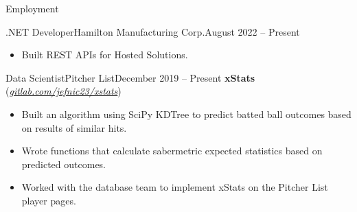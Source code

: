 \documentclass[calibri]{mcdowellcv}
\begin{document}
	\makeheader
	
	\begin{cvsection}{Employment}
		\begin{cvsubsection}{.NET Developer}{Hamilton Manufacturing Corp.}{August 2022 -- Present}
			\begin{itemize}
				\item Built REST APIs for Hosted Solutions.
			\end{itemize}
		\end{cvsubsection}
		\begin{cvsubsection}{Data Scientist}{Pitcher List}{December 2019 -- Present}
			\textbf{xStats} (\textit{{\color{blue}\href{https://gitlab.com/jefnic23/xstats}{gitlab.com/jefnic23/xstats}}})
			\begin{itemize}
				\item Built an algorithm using SciPy KDTree to predict batted ball outcomes based on results of similar hits.
				\item Wrote functions that calculate sabermetric expected statistics based on predicted outcomes.
				\item Worked with the database team to implement xStats on the Pitcher List player pages.
			\end{itemize}
		\end{cvsubsection}
	\end{cvsection}
\end{document}
